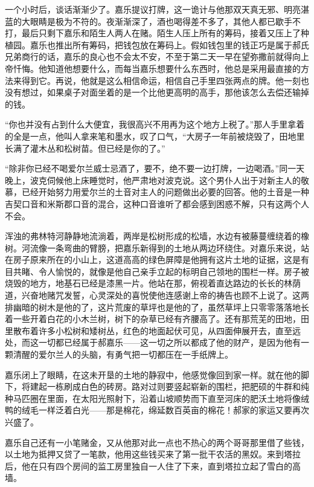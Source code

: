 \par 一个小时后，谈话渐渐少了。嘉乐提议打牌，这一诡计与他那双天真无邪、明亮湛蓝的大眼睛是极为不符的。夜渐渐深了，酒也喝得差不多了，其他人都已歇手不打，最后只剩下嘉乐和陌生人两人在赌。陌生人压上所有的筹码，接着又压上了种植园。嘉乐也推出所有筹码，把钱包放在筹码上。假如钱包里的钱正巧是属于郝氏兄弟商行的话，嘉乐的良心也不会太不安，不至于第二天一早在望弥撒前就得向上帝忏悔。他知道他想要什么，而每当嘉乐想要什么东西时，他总是采用最直接的方法来得到它。再说，他就是这么相信命运，相信自己手里四张两点的牌。他一刻也没有想过，如果桌子对面坐着的是一个比他更高明的高手，那他该怎么去偿还输掉的钱。
\par “你也并没有占到什么大便宜，我很高兴不用再为这个地方上税了。”那人手里拿着的全是一点，他叫人拿来笔和墨水，叹了口气，“大房子一年前被烧毁了，田地里长满了灌木丛和松树苗。但已经是你的了。”
\par “除非你已经不喝爱尔兰威士忌酒了，要不，绝不要一边打牌，一边喝酒。”同一天晚上，波克伺候他上床睡觉时，他严肃地对波克说。这个男仆人出于对新主人的敬慕，已经开始努力用爱尔兰的土音对主人的问题做出必要的回答。他的土音是一种吉契口音和米斯郡口音的混合，这种口音谁听了都会感到困惑不解，只有这两个人不会。
\par 浑浊的弗林特河静静地流淌着，两岸是松树形成的松墙，水边有被藤蔓缠绕着的橡树。河流像一条弯曲的臂膀，把嘉乐新得到的土地从两边环绕住。对嘉乐来说，站在房子原来所在的小山上，这道高高的绿色屏障是他拥有这片土地的证据，这是有目共睹、令人愉悦的，就像是他自己亲手立起的标明自己领地的围栏一样。房子被烧毁的地方，地基石已经是漆黑一片。他站在那，俯视着直达路边的长长的林荫道，兴奋地赌咒发誓，心灵深处的喜悦使他连感谢上帝的祷告也顾不上说了。这两排幽暗的树木是他的了，这片荒废的草坪也是他的了，虽然草坪上只零零落落地长着一些开着白花的小木兰树，树下的杂草已经有齐腰高了。还有那荒芜的田地，田里散布着许多小松树和矮树丛，红色的地面起伏可见，从四面伸展开去，直至远处，而这一切都已经属于郝嘉乐——这一切之所以都成了他的财产，是因为他有一颗清醒的爱尔兰人的头脑，有勇气把一切都压在一手纸牌上。
\par 嘉乐闭上了眼睛，在这未开垦的土地的静寂中，他感觉像回到家一样。就在他的脚下，将建起一栋刷成白色的砖房。路对过则要竖起崭新的围栏，把肥硕的牛群和纯种马匹圈在里面，在太阳光照射下，沿着山坡顺势而下直至河床的肥沃土地将像绒鸭的绒毛一样泛着白光——那是棉花，绵延数百英亩的棉花！郝家的家运又要再次兴盛了。
\par 嘉乐自己还有一小笔赌金，又从他那对此一点也不热心的两个哥哥那里借了些钱，以土地为抵押又贷了一笔款，他用这些钱买来了第一批干农活的黑奴。来到塔拉后，他在只有四个房间的监工房里独自一人住了下来，直到塔拉立起了雪白的高墙。
